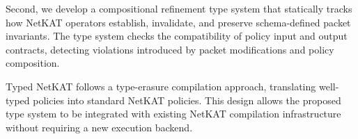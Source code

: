 Second, we develop a compositional refinement type system that statically tracks how NetKAT operators establish, invalidate, and preserve schema-defined packet invariants. The type system checks the compatibility of policy input and output contracts, detecting violations introduced by packet modifications and policy composition.

Typed NetKAT follows a type-erasure compilation approach, translating well-typed policies into standard NetKAT
policies. This design allows the proposed type system to be integrated with existing NetKAT compilation infrastructure without requiring a new execution backend.

